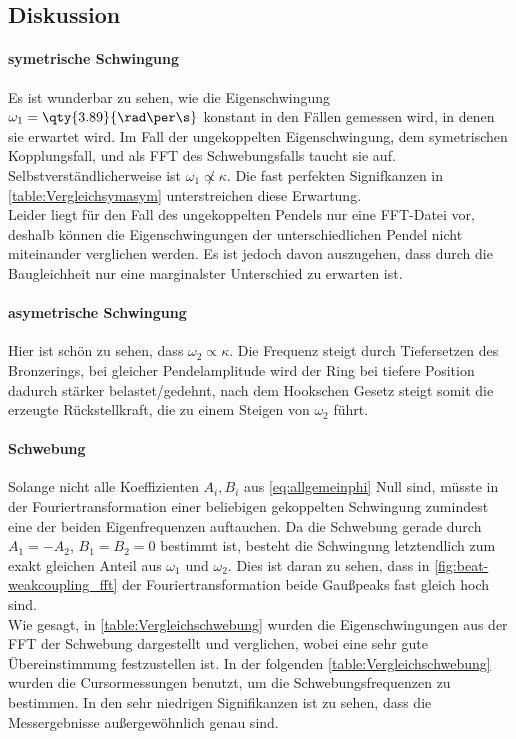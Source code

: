 \subsection{Diskussion}
\paragraph{symetrische Schwingung}
Es ist wunderbar zu sehen, wie die Eigenschwingung \(\omega_1=\qty{3.89}{\rad\per\s}\) konstant in den Fällen gemessen wird, in denen sie erwartet wird. Im Fall der ungekoppelten Eigenschwingung, dem symetrischen Kopplungsfall, und als FFT des Schwebungsfalls taucht sie auf. Selbstverständlicherweise ist \(\omega_1\not\propto\kappa\). Die fast perfekten Signifkanzen in \cref{table:Vergleichsymasym} unterstreichen diese Erwartung.\\
Leider liegt für den Fall des ungekoppelten Pendels nur eine FFT-Datei vor, deshalb können die Eigenschwingungen der unterschiedlichen Pendel nicht miteinander verglichen werden. Es ist jedoch davon auszugehen, dass durch die Baugleichheit nur eine marginalster Unterschied zu erwarten ist.

\paragraph{asymetrische Schwingung}
Hier ist schön zu sehen, dass \(\omega_2\propto\kappa\). Die Frequenz steigt durch Tiefersetzen des Bronzerings, bei gleicher Pendelamplitude wird der Ring bei tiefere Position dadurch stärker belastet/gedehnt, nach dem Hookschen Gesetz steigt somit die erzeugte Rückstellkraft, die zu einem Steigen von \(\omega_2\) führt. 

\paragraph{Schwebung}
Solange nicht alle Koeffizienten \(A_i,B_i\) aus \cref{eq:allgemeinphi} Null sind, müsste in der Fouriertransformation einer beliebigen gekoppelten Schwingung zumindest eine der beiden Eigenfrequenzen auftauchen. Da die Schwebung gerade durch \(A_1 = -A_2\), \(B_1=B_2=0\) bestimmt ist, besteht die Schwingung letztendlich zum exakt gleichen Anteil aus \(\omega_1\) und \(\omega_2\). Dies ist daran zu sehen, dass in \cref{fig:beat-weakcoupling_fft} der Fouriertransformation beide Gaußpeaks fast gleich hoch sind. \\
Wie gesagt, in \cref{table:Vergleichschwebung} wurden die Eigenschwingungen aus der FFT der Schwebung dargestellt und verglichen, wobei eine sehr gute Übereinstimmung festzustellen ist. In der folgenden \cref{table:Vergleichschwebung} wurden die Cursormessungen benutzt, um die Schwebungsfrequenzen zu bestimmen. In den sehr niedrigen Signifikanzen ist zu sehen, dass die Messergebnisse außergewöhnlich genau sind.


